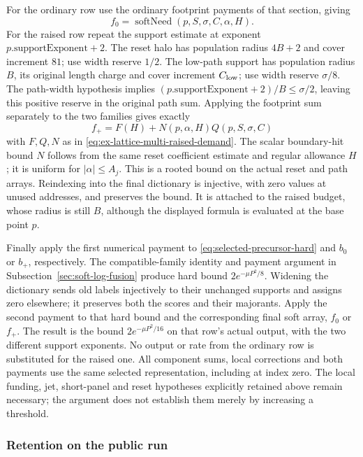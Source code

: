 For the ordinary row use the ordinary footprint payments of that
section, giving \[
 f_0=\operatorname{softNeed}(p,S,\sigma,C,\alpha,H).
\]
For the raised row repeat the support estimate at exponent
$p.\mathrm{supportExponent}+2$. The reset halo has population radius
$4B+2$ and cover increment $81$; use width reserve $1/2$.
The low-path support has population radius $B$, its original length
charge and cover increment $C_{\rm low}$; use width reserve
$\sigma/8$. The path-width hypothesis implies
$(p.\mathrm{supportExponent}+2)/B\le\sigma/2$, leaving this
positive reserve in the original path sum. Applying the footprint
sum separately to the two families gives exactly
\[
 f_+=F(H)+N(p,\alpha,H)Q(p,S,\sigma,C)
\]
with $F,Q,N$ as in \eqref{eq:ex-lattice-multi-raised-demand}.
The scalar boundary-hit bound $N$ follows from the same reset
coefficient estimate and regular allowance $H$; it is uniform for
$|\alpha|\le A_j$. This is a rooted bound on the actual reset and
path arrays. Reindexing into the final dictionary is injective,
with zero values at unused addresses, and preserves the bound.
It is attached to the raised budget, whose radius is still $B$,
although the displayed formula is evaluated at the base point $p$.

Finally apply the first numerical payment to
\eqref{eq:selected-precursor-hard} and $b_0$ or $b_+$, respectively.
The compatible-family identity and payment argument in
Subsection~\ref{sec:soft-log-fusion} produce hard bound
$2e^{-\mu P^2/8}$. Widening the dictionary sends old labels
injectively to their unchanged supports and assigns zero elsewhere;
it preserves both the scores and their majorants. Apply the second
payment to that hard bound and the corresponding final soft array,
$f_0$ or $f_+$. The result is the bound $2e^{-\mu P^2/16}$ on
that row's actual output, with the two different support exponents.
No output or rate from the ordinary row is substituted for the raised
one. All component sums, local corrections and both payments use
the same selected representation, including at index zero. The local
funding, jet, short-panel and reset hypotheses explicitly retained
above remain necessary; the argument does not establish them merely
by increasing a threshold.

\subsubsection{Retention on the public run}
\label{sec:selected-retention-public}

